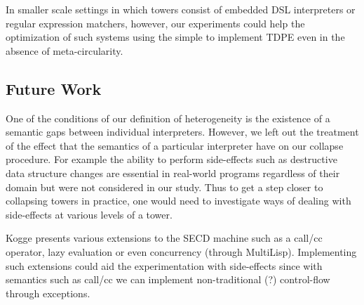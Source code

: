 \documentclass[a4paper,12pt,twoside,openright]{report}
\theoremstyle{definition}
\newcommand{\mslang}{$\lambda_{\uparrow\downarrow}$}
\newcommand{\mevl}{$M_{e}$}
\begin{document}


In smaller scale settings in which towers consist of embedded DSL interpreters or regular expression matchers, however, our experiments could help the optimization of such systems using the simple to implement TDPE even in the absence of meta-circularity.

\subsection{Future Work}\label{subsec:future}
One of the conditions of our definition of heterogeneity is the existence of a semantic gaps between individual interpreters. However, we left out the treatment of the effect that the semantics of a particular interpreter have on our collapse procedure. For example the ability to perform side-effects such as destructive data structure changes are essential in real-world programs regardless of their domain but were not considered in our study. Thus to get a step closer to collapsing towers in practice, one would need to investigate ways of dealing with side-effects at various levels of a tower.

Kogge presents various extensions to the SECD machine such as a call/cc operator, lazy evaluation or even concurrency (through MultiLisp). Implementing such extensions could aid the experimentation with side-effects since with semantics such as call/cc we can implement non-traditional (?) control-flow through exceptions.
\end{document}

